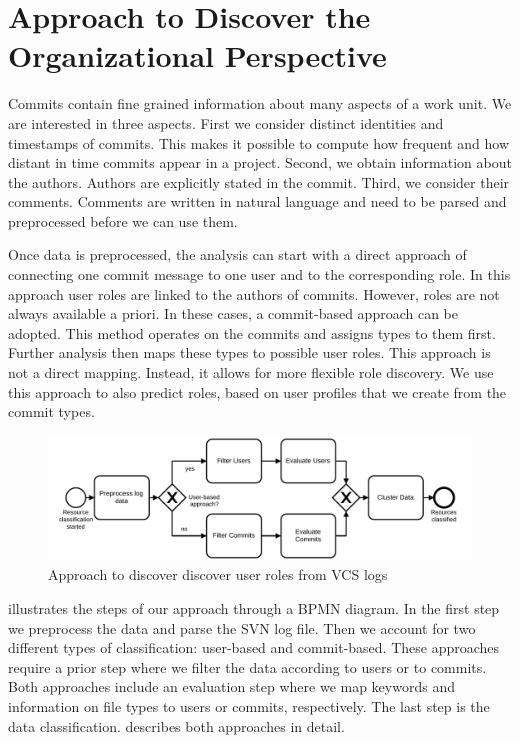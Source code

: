 \section{Approach to Discover the Organizational Perspective}\label{sec:concept}


Commits contain fine grained information about many aspects of a work unit. We are interested in three aspects. First we consider distinct identities and timestamps of commits. This makes it possible to compute how frequent and how distant in time commits appear in a project. Second, we obtain information about the authors. Authors are explicitly stated in the commit. Third, we consider their comments. Comments are written in natural language and need to be parsed and preprocessed before we can use them.

Once data is preprocessed, the analysis can start with a direct approach of connecting one commit message to one user and to the corresponding role. In this approach user roles are linked to the authors of commits. However, roles are not always available a priori. In these cases, a commit-based approach can be adopted. This method operates on the commits and assigns types to them first. Further analysis then maps these types to possible user roles. This approach is not a direct mapping. Instead, it allows for more flexible role discovery. We use this approach to also predict roles, based on user profiles that we create from the commit types.

\begin{figure}[htb]
   \centering
   \includegraphics[width=1\linewidth]{ResourceClassification/figures/approach-bpmn}
   \caption[Approach to discover discover user roles from VCS logs]{Approach to discover discover user roles from VCS logs}
   \label{fig:approach-bpmn}
\end{figure}

 illustrates the steps of our approach through a BPMN diagram. In the first step we preprocess the data and parse the SVN log file. Then we account for two different types of classification: user-based and commit-based. These approaches require a prior step where we filter the data according to users or to commits. Both approaches include an evaluation step where we map keywords and information on file types to users or commits, respectively. The last step is the data classification.  describes both approaches in detail.
